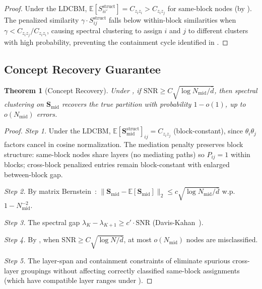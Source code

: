 \documentclass[11pt]{article}
\newtheorem{theorem}{Theorem}[section]
\newcommand{\bS}{\mathbf{S}}
\newcommand{\E}{\mathbb{E}}
\newcommand{\1}{\mathbbm{1}}
\begin{document}
\begin{proof}
  Under the LDCBM, $\E[S^{\mathrm{struct}}_{ii'}] = C_{z_i z_i} > C_{z_i z_j}$ for same-block nodes (by ).
  The penalized similarity $\gamma \cdot S^{\mathrm{struct}}_{ij}$ falls below within-block similarities when $\gamma < C_{z_i z_j} / C_{z_i z_i}$, causing spectral clustering to assign $i$ and $j$ to different clusters with high probability, preventing the containment cycle identified in .
\end{proof}

\subsection{Concept Recovery Guarantee}
\label{sec:recovery}

\begin{theorem}[Concept Recovery]
\label{thm:recovery}
  Under , if $\mathrm{SNR} \ge C \sqrt{\log N_{\mathrm{mid}} / \bar{d}}$, then spectral clustering on $\bS_{\mathrm{mid}}$ recovers the true partition with probability $1 - o(1)$, up to $o(N_{\mathrm{mid}})$ errors.
\end{theorem}

\begin{proof}
  \emph{Step 1.} Under the LDCBM, $\E[\bS^{\mathrm{struct}}_{\mathrm{mid}}]_{ij} = C_{z_i z_j}$ (block-constant), since $\theta_i\theta_j$ factors cancel in cosine normalization. The mediation penalty preserves block structure: same-block nodes share layers (no mediating paths) so $P_{ij} = 1$ within blocks; cross-block penalized entries remain block-constant with enlarged between-block gap.

  \emph{Step 2.} By matrix Bernstein~\citep{tropp2012user}: $\|\bS_{\mathrm{mid}} - \E[\bS_{\mathrm{mid}}]\|_2 \le c\sqrt{\log N_{\mathrm{mid}}/\bar{d}}$ w.p. $1 - N_{\mathrm{mid}}^{-2}$.

  \emph{Step 3.} The spectral gap $\lambda_K - \lambda_{K+1} \ge c' \cdot \mathrm{SNR}$ (Davis-Kahan~\citep{davis1970rotation}).

  \emph{Step 4.} By \citet{lei2015consistency}, when $\mathrm{SNR} \ge C\sqrt{\log N / \bar{d}}$, at most $o(N_{\mathrm{mid}})$ nodes are misclassified.

  \emph{Step 5.} The layer-span and containment constraints of  eliminate spurious cross-layer groupings without affecting correctly classified same-block assignments (which have compatible layer ranges under ).
\end{proof}
\end{document}
